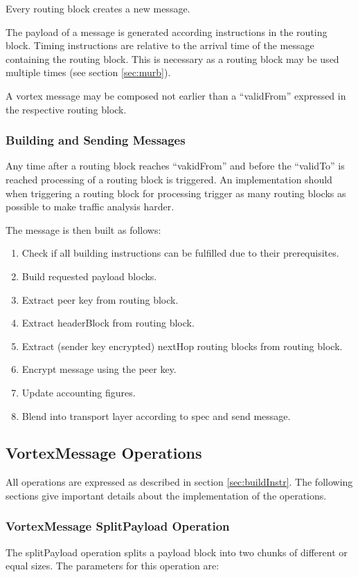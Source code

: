 Every routing block creates a new message.

The payload of a message is generated according instructions in the routing block. Timing instructions are relative to the arrival time of the message containing the routing block. This is necessary as a routing block may be used multiple times (see section \ref{sec:murb}).

A vortex message may be composed not earlier than a ``validFrom'' expressed in the respective routing block.

\subsubsection{Building and Sending Messages}
Any time after a routing block reaches ``vakidFrom'' and before the ``validTo'' is reached processing of a routing block is triggered. An implementation should when triggering a routing block for processing trigger as many routing blocks as possible to make traffic analysis harder.

The message is then built as follows:
\begin{enumerate}
	\item Check if all building instructions can be fulfilled due to their prerequisites.
	\item Build requested payload blocks.
	\item Extract peer key from routing block.
	\item Extract headerBlock from routing block.
	\item Extract (sender key encrypted) nextHop routing blocks from routing block.
	\item Encrypt message using the peer key.
	\item Update accounting figures.
	\item Blend into transport layer according to spec and send message.
\end{enumerate}

\subsection{VortexMessage Operations}
All operations are expressed as described in section \ref{sec:buildInstr}. The following sections give important details about the implementation of the operations.

\subsubsection{VortexMessage SplitPayload Operation}
The splitPayload operation splits a payload block into two chunks of different or equal sizes. The parameters for this operation are:

